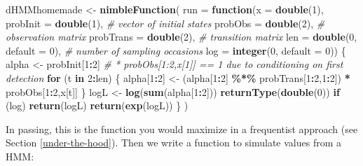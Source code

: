 \documentclass[
  12pt,
]{krantz}
\newenvironment{Shaded}{\begin{snugshade}}{\end{snugshade}}
\newcommand{\AttributeTok}[1]{\textcolor[rgb]{0.13,0.29,0.53}{#1}}
\newcommand{\CommentTok}[1]{\textcolor[rgb]{0.56,0.35,0.01}{\textit{#1}}}
\newcommand{\ControlFlowTok}[1]{\textcolor[rgb]{0.13,0.29,0.53}{\textbf{#1}}}
\newcommand{\DecValTok}[1]{\textcolor[rgb]{0.00,0.00,0.81}{#1}}
\newcommand{\FunctionTok}[1]{\textcolor[rgb]{0.13,0.29,0.53}{\textbf{#1}}}
\newcommand{\NormalTok}[1]{#1}
\newcommand{\OtherTok}[1]{\textcolor[rgb]{0.56,0.35,0.01}{#1}}
\newcommand{\SpecialCharTok}[1]{\textcolor[rgb]{0.81,0.36,0.00}{\textbf{#1}}}
\begin{document}
\begin{Shaded}
\begin{Highlighting}[]
\NormalTok{dHMMhomemade }\OtherTok{\textless{}{-}} \FunctionTok{nimbleFunction}\NormalTok{(}
  \AttributeTok{run =} \ControlFlowTok{function}\NormalTok{(}\AttributeTok{x =} \FunctionTok{double}\NormalTok{(}\DecValTok{1}\NormalTok{), }
                 \AttributeTok{probInit =} \FunctionTok{double}\NormalTok{(}\DecValTok{1}\NormalTok{), }\CommentTok{\# vector of initial states}
                 \AttributeTok{probObs =} \FunctionTok{double}\NormalTok{(}\DecValTok{2}\NormalTok{), }\CommentTok{\# observation matrix}
                 \AttributeTok{probTrans =} \FunctionTok{double}\NormalTok{(}\DecValTok{2}\NormalTok{), }\CommentTok{\# transition matrix}
                 \AttributeTok{len =} \FunctionTok{double}\NormalTok{(}\DecValTok{0}\NormalTok{, }\AttributeTok{default =} \DecValTok{0}\NormalTok{), }\CommentTok{\# number of sampling occasions}
                 \AttributeTok{log =} \FunctionTok{integer}\NormalTok{(}\DecValTok{0}\NormalTok{, }\AttributeTok{default =} \DecValTok{0}\NormalTok{)) \{}
\NormalTok{    alpha }\OtherTok{\textless{}{-}}\NormalTok{ probInit[}\DecValTok{1}\SpecialCharTok{:}\DecValTok{2}\NormalTok{] }\CommentTok{\# * probObs[1:2,x[1]] == 1 due to conditioning on first detection}
    \ControlFlowTok{for}\NormalTok{ (t }\ControlFlowTok{in} \DecValTok{2}\SpecialCharTok{:}\NormalTok{len) \{}
\NormalTok{      alpha[}\DecValTok{1}\SpecialCharTok{:}\DecValTok{2}\NormalTok{] }\OtherTok{\textless{}{-}}\NormalTok{ (alpha[}\DecValTok{1}\SpecialCharTok{:}\DecValTok{2}\NormalTok{] }\SpecialCharTok{\%*\%}\NormalTok{ probTrans[}\DecValTok{1}\SpecialCharTok{:}\DecValTok{2}\NormalTok{,}\DecValTok{1}\SpecialCharTok{:}\DecValTok{2}\NormalTok{]) }\SpecialCharTok{*}\NormalTok{ probObs[}\DecValTok{1}\SpecialCharTok{:}\DecValTok{2}\NormalTok{,x[t]]}
\NormalTok{    \}}
\NormalTok{    logL }\OtherTok{\textless{}{-}} \FunctionTok{log}\NormalTok{(}\FunctionTok{sum}\NormalTok{(alpha[}\DecValTok{1}\SpecialCharTok{:}\DecValTok{2}\NormalTok{]))}
    \FunctionTok{returnType}\NormalTok{(}\FunctionTok{double}\NormalTok{(}\DecValTok{0}\NormalTok{))}
    \ControlFlowTok{if}\NormalTok{ (log) }\FunctionTok{return}\NormalTok{(logL)}
    \FunctionTok{return}\NormalTok{(}\FunctionTok{exp}\NormalTok{(logL))}
\NormalTok{  \}}
\NormalTok{)}
\end{Highlighting}
\end{Shaded}

In passing, this is the function you would maximize in a frequentist approach (see Section \ref{under-the-hood}). Then we write a function to simulate values from a HMM:
\end{document}
